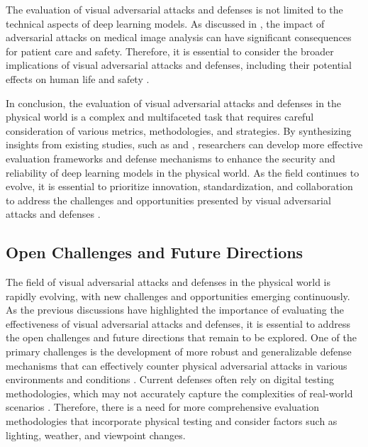 \documentclass[11pt,a4paper]{article}
\begin{document}
The evaluation of visual adversarial attacks and defenses is not limited to the technical aspects of deep learning models. As discussed in \cite{doi:10.3390/cancers15174228}, the impact of adversarial attacks on medical image analysis can have significant consequences for patient care and safety. Therefore, it is essential to consider the broader implications of visual adversarial attacks and defenses, including their potential effects on human life and safety \cite{doi:10.1145/3702638}.

In conclusion, the evaluation of visual adversarial attacks and defenses in the physical world is a complex and multifaceted task that requires careful consideration of various metrics, methodologies, and strategies. By synthesizing insights from existing studies, such as \cite{doi:10.24963/ijcai.2021/694} and \cite{arxiv:1807.07769}, researchers can develop more effective evaluation frameworks and defense mechanisms to enhance the security and reliability of deep learning models in the physical world. As the field continues to evolve, it is essential to prioritize innovation, standardization, and collaboration to address the challenges and opportunities presented by visual adversarial attacks and defenses \cite{doi:10.1007/s11263-023-01934-3}.


\subsection{Open Challenges and Future Directions}


The field of visual adversarial attacks and defenses in the physical world is rapidly evolving, with new challenges and opportunities emerging continuously. As the previous discussions have highlighted the importance of evaluating the effectiveness of visual adversarial attacks and defenses, it is essential to address the open challenges and future directions that remain to be explored. One of the primary challenges is the development of more robust and generalizable defense mechanisms that can effectively counter physical adversarial attacks in various environments and conditions \cite{doi:10.1007/s11633-019-1211-x}. Current defenses often rely on digital testing methodologies, which may not accurately capture the complexities of real-world scenarios \cite{doi:10.1007/978-3-030-58589-1_3}. Therefore, there is a need for more comprehensive evaluation methodologies that incorporate physical testing and consider factors such as lighting, weather, and viewpoint changes.
\end{document}
